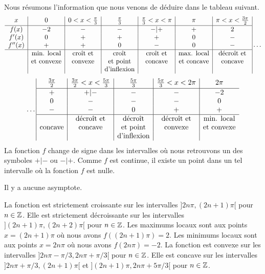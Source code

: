 {Nous résumons l'information que nous venons de déduire dans le tableau suivant.
\[
\begin{array}{c|c|c|c|c|c|c|}
\rule[-0.5em]{0em}{1em}
x & 0 & 0<x<\frac{\pi}{3} & \frac{\pi}{3} & \frac{\pi}{3} < x < \pi
& \pi & \pi < x < \frac{3\pi}{2} \\
\hline
f(x) & -2 & - & - & -|+ & + & 2 \\
f'(x) & 0 & + & + & + & 0 & - \\
f''(x) & + & + & 0 & - & 0 & - \\ 
\hline
& \text{min. local} & \text{croît et} & \text{croît}
& \text{croît et} & \text{max. local} & \text{décroît et} \\
& \text{et convexe} & \text{convexe} & \text{et point}
& \text{concave} & \text{et concave} & \text{concave} \\
& & & \text{d'inflexion} & & &
\end{array}
\ldots
\]
\[
\ldots
\begin{array}{|c|c|c|c|c}
\rule[-0.5em]{0em}{1em}
\frac{3\pi}{2} & \frac{3\pi}{2} < x < \frac{5\pi}{3} & \frac{5\pi}{3}
  & \frac{5\pi}{3} < x < 2\pi & 2\pi \\
\hline
+  & +|- & - & - & -2 \\
0 & - & - & - &  0 \\
- & - & 0 & + & + \\
\hline
& \text{décroît et} & \text{décroît} &
\text{décroît et} & \text{min. local} \\
\text{concave} & \text{concave} & \text{et point} &
\text{convexe} & \text{et convexe} \\
& & \text{d'inflexion} & &
\end{array}
\]
La fonction $f$ change de signe dans les intervalles où nous retrouvons un des
symboles $+|-$ ou $-|+$.  Comme $f$ est continue, il existe un point dans
un tel intervalle où la fonction $f$ est nulle.

Il y a aucune asymptote.

La fonction est strictement croissante sur les intervalles
$]2n\pi,(2n+1)\pi[$ pour $n \in \mathbb{Z}$.  Elle est
strictement décroissante sur les intervalles $](2n+1)\pi,(2n+2)\pi[$
pour $n \in \mathbb{Z}$.   Les maximums locaux sont aux points $x= (2n+1)\pi$
où nous avons $f( (2n+1)\pi) = 2$.  Les minimums locaux sont aux
points
$x= 2n\pi$ où nous avons $f(2n\pi) = -2$.  La fonction est convexe sur les
intervalles $]2n\pi - \pi/3, 2n\pi + \pi/3[$ pour
$n \in \mathbb{Z}$.  Elle est concave sur les intervalles
$]2n\pi + \pi/3, (2n+1)\pi[$ et
$](2n+1)\pi, 2n\pi + 5\pi/3[$ pour $n\in \mathbb{Z}$.

}
